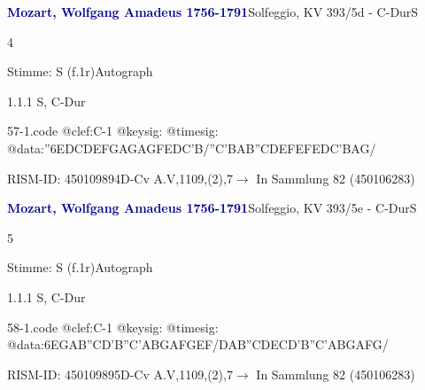 \documentclass[a4paper, twocolumn, 11pt]{book}
\begin{document}
\par \vspace{16pt} \textcolor{darkblue}{\textbf{Mozart, Wolfgang Amadeus  1756-1791}}\hfillplus{[57]}\newline Solfeggio, KV 393/5d - C-Dur\newline S
\par \begin{itshape} 4\end{itshape} 
\par \textcolor{darkblue}{}  Stimme: S  (f.1r)\newline Autograph
\par 1.1.1  S, C-Dur  
\begin{filecontents*}{57-1.code}
@clef:C-1
@keysig:
@timesig:
@data:''{6EDCD}{EFGA}{GAGF}{EDC'B}/{''C'BAB}{''CDEF}{EFED}{C'BAG}/
\end{filecontents*}

\newline %
\par RISM-ID: 450109894\newline D-Cv  A.V,1109,(2),7\newline $\rightarrow$ In Sammlung 82 (450106283)
      
\par \vspace{16pt} \textcolor{darkblue}{\textbf{Mozart, Wolfgang Amadeus  1756-1791}}\hfillplus{[58]}\newline Solfeggio, KV 393/5e - C-Dur\newline S
\par \begin{itshape} 5\end{itshape} 
\par \textcolor{darkblue}{}  Stimme: S  (f.1r)\newline Autograph
\par 1.1.1  S, C-Dur  
\begin{filecontents*}{58-1.code}
@clef:C-1
@keysig:
@timesig:
@data:6{EGAB}{''CD'B''C}{'ABGA}{FGEF}/{DAB''C}{DECD}{'B''C'AB}{GAFG}/
\end{filecontents*}

\newline %
\par RISM-ID: 450109895\newline D-Cv  A.V,1109,(2),7\newline $\rightarrow$ In Sammlung 82 (450106283)
      
\end{document}
